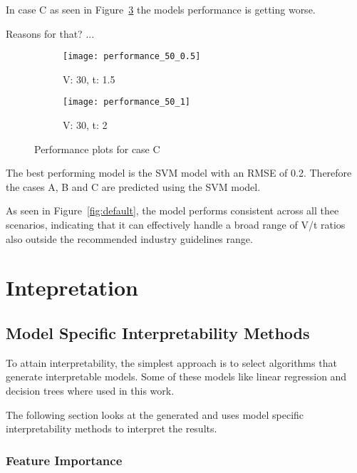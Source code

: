 In case C as seen in Figure~\ref{fig:performance-case-c} the models performance is
getting worse.

Reasons for that? ...

\begin{figure}[H]
    \begin{tcolorbox}[arc=0pt,boxrule=0.5pt]
        \begin{subfigure}{0.5\textwidth}
            \texttt{[image: performance\_50\_0.5]}
            \caption{V: 30, t: 1.5}
            \label{fig:performance-30_1.5}
        \end{subfigure}
        \hfill
        \begin{subfigure}{0.5\textwidth}
            \texttt{[image: performance\_50\_1]}
            \caption{V: 30, t: 2}
            \label{fig:performance-30_2.0}
        \end{subfigure}
    \end{tcolorbox}
    \caption{Performance plots for case C}
    \label{fig:performance-case-c}
\end{figure}


The best performing model is the \ac{SVM} model with an \ac{RMSE} of 0.2.
Therefore the cases A, B and C are predicted using the \ac{SVM} model.

As seen in Figure~\ref{fig:default}, the model performs consistent across all thee
scenarios, indicating that it can effectively handle a broad range of V/t ratios also
outside the recommended industry guidelines range.


\section{Intepretation}
\subsection{Model Specific Interpretability
Methods}\label{subsec:model-specific-interpretability
-methods}

To attain interpretability, the simplest approach is to select algorithms
that generate
interpretable models.
Some of these models like linear regression and decision trees where used in
this work.

The following section looks at the generated and uses model specific
interpretability methods to
interpret the results.

\subsubsection{Feature Importance}

